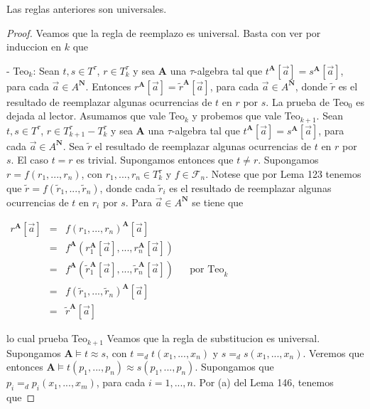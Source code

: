   \begin{lemma}
    Las reglas anteriores son universales.
  \end{lemma}
  \begin{proof}
    Veamos que la regla de reemplazo es universal. Basta con ver por induccion en \(k\) que

    - Teo\(_{k}\): Sean \(t,s\in T^{\tau }\), \(r\in T_{k}^{\tau }\) y sea \( \mathbf{A}\) una \(\tau \)-algebra tal que \(t^{\mathbf{A}}[\vec{a}]=s^{\mathbf{A }}[\vec{a}]\), para cada \(\vec{a}\in A^{\mathbf{N}}\). Entonces \(r^{\mathbf{A} }[\vec{a}]=\tilde{r}^{\mathbf{A}}[\vec{a}]\), para cada \(\vec{a}\in A^{ \mathbf{N}}\), donde \(\tilde{r}\) es el resultado de reemplazar algunas ocurrencias de \(t\) en \(r\) por \(s.\)
    La prueba de Teo\(_{0}\) es dejada al lector. Asumamos que vale Teo\(_{k}\) y probemos que vale Teo\(_{k+1}\). Sean \(t,s\in T^{\tau }\), \(r\in T_{k+1}^{\tau }-T_{k}^{\tau }\) y sea \(\mathbf{A}\) una \(\tau \)-algebra tal que \(t^{\mathbf{A }}[\vec{a}]=s^{\mathbf{A}}[\vec{a}]\), para cada \(\vec{a}\in A^{\mathbf{N}}\). Sea \(\tilde{r}\) el resultado de reemplazar algunas ocurrencias de \(t\) en \(r\) por \(s\). El caso \(t=r\) es trivial. Supongamos entonces que \(t\neq r\). Supongamos \(r=f(r_{1},...,r_{n})\), con \(r_{1},...,r_{n}\in T_{k}^{\tau }\) y \( f\in \mathcal{F}_{n}\). Notese que por Lema 123 tenemos que \(\tilde{r}=f(\tilde{r}_{1},...,\tilde{r}_{n})\), donde cada \(\tilde{r} _{i} \) es el resultado de reemplazar algunas ocurrencias de \(t\) en \(r_{i}\) por \(s\). Para \(\vec{a}\in A^{\mathbf{N}}\) se tiene que

    \(\displaystyle \begin{array}{cclll} r^{\mathbf{A}}[\vec{a}] & = & f(r_{1},...,r_{n})^{\mathbf{A}}[\vec{a}] & & \\ & = & f^{\mathbf{A}}(r_{1}^{\mathbf{A}}[\vec{a}],...,r_{n}^{\mathbf{A}}[\vec{ a}]) & & \\ & = & f^{\mathbf{A}}(\tilde{r}_{1}^{\mathbf{A}}[\vec{a}],...,\tilde{r}_{n}^{ \mathbf{A}}[\vec{a}]) & & \text{por Teo}_{k} \\ & = & f(\tilde{r}_{1},...,\tilde{r}_{n})^{\mathbf{A}}[\vec{a}] & & \\ & = & \tilde{r}^{\mathbf{A}}[\vec{a}] & & \end{array} \)

    lo cual prueba Teo\(_{k+1}\)
    Veamos que la regla de substitucion es universal. Supongamos \(\mathbf{A} \models t\approx s\), con \(t=_{d}t(x_{1},...,x_{n})\) y \( s=_{d}s(x_{1},...,x_{n})\). Veremos que entonces \(\mathbf{A}\models t(p_{1},...,p_{n})\approx s(p_{1},...,p_{n}).\) Supongamos que \( p_{i}=_{d}p_{i}(x_{1},...,x_{m})\), para cada \(i=1,...,n.\) Por (a) del Lema 146, tenemos que


\end{proof}
